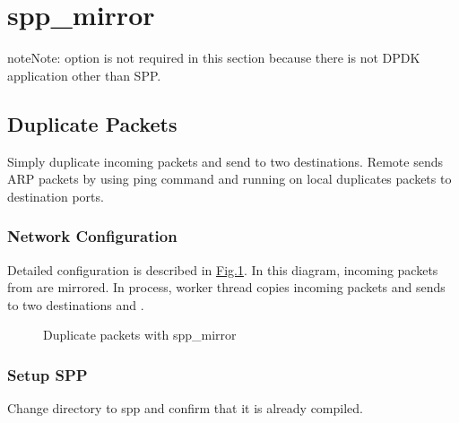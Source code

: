 \documentclass[a4paper,11pt,openany,oneside,english]{sphinxmanual}
\begin{document}
\section{spp\_mirror}
\label{\detokenize{usecases/spp_mirror:spp-mirror}}\label{\detokenize{usecases/spp_mirror:spp-usecases-mirror}}\label{\detokenize{usecases/spp_mirror::doc}}
\begin{sphinxadmonition}{note}{Note:}
 option is not required in this section because there is
not DPDK application other than SPP.
\end{sphinxadmonition}


\subsection{Duplicate Packets}
\label{\detokenize{usecases/spp_mirror:duplicate-packets}}
Simply duplicate incoming packets and send to two destinations.
Remote  sends ARP packets by using ping command and
 running on local  duplicates packets to
destination ports.


\subsubsection{Network Configuration}
\label{\detokenize{usecases/spp_mirror:network-configuration}}
Detailed configuration is described in
\hyperref[\detokenize{usecases/spp_mirror:figure-spp-mirror-use-cases-nw-config}]{Fig.\@ \ref{\detokenize{usecases/spp_mirror:figure-spp-mirror-use-cases-nw-config}}}.
In this diagram, incoming packets from  are mirrored.
In  process, worker thread  copies incoming packets and
sends to two destinations  and .

\begin{figure}[htbp]
\centering
\capstart

\noindent{}
\caption{Duplicate packets with spp\_mirror}\label{\detokenize{usecases/spp_mirror:id4}}\label{\detokenize{usecases/spp_mirror:figure-spp-mirror-use-cases-nw-config}}\end{figure}


\subsubsection{Setup SPP}
\label{\detokenize{usecases/spp_mirror:setup-spp}}
Change directory to spp and confirm that it is already compiled.
\end{document}
